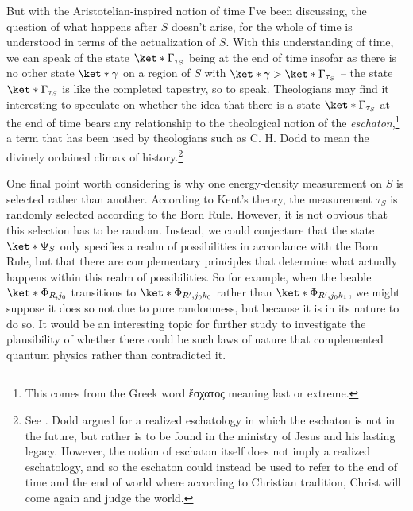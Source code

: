 \documentclass[12pt]{report}
\begin{document}
But with the Aristotelian-inspired notion of time I've been discussing, the question of what happens after $S$ doesn't arise, for the whole of time is understood in terms of the actualization of $S$. With this understanding of time, we can speak of the state $\ket*{\Gamma_{\tau_S}}$ being at the end of time insofar as there is no other state $\ket*{\gamma}$  on a region of $S$ with $\ket*{\gamma}>\ket*{\Gamma_{\tau_S}}$ -- the state $\ket*{\Gamma_{\tau_S}}$ is like the completed tapestry, so to speak. Theologians may find it interesting to speculate on whether the idea that there is a state $\ket*{\Gamma_{\tau_S}}$ at the end of time bears any relationship to the theological notion of the \emph{eschaton},\footnote{This comes from the Greek word \textgreek{ἔσχατος}   meaning last or extreme. } a term that has been used by theologians such as C. H. Dodd to mean the divinely ordained climax of history.\footnote{See \cite[36]{DoddC.H1961Tpot}. Dodd argued for a realized eschatology in which the eschaton is not in the future, but rather is to be found in the ministry of Jesus and his lasting legacy. However, the notion of eschaton itself does not imply a realized eschatology, and so the eschaton could instead be used to refer to the end of time and the end of world where according to Christian tradition, Christ will come again and judge the world.} 

One final point worth considering is why one energy-density measurement on $S$ is selected rather than another. According to Kent's theory, the measurement $\tau_S$ is randomly selected according to the Born Rule. However, it is not obvious that this selection has to be random. Instead, we could conjecture that the state $\ket*{\Psi_S}$ only specifies a realm of possibilities in accordance with the Born Rule, but that there are complementary principles that determine what actually happens within this realm of possibilities. So for example, when the beable $\ket*{\Phi_{R,j_0}}$ transitions to $\ket*{\Phi_{R', j_0k_0}}$ rather than $\ket*{\Phi_{R', j_0k_1}}$, we might suppose it does so not due to pure randomness, but because it is in its nature to do so. It would be an interesting topic for further study to investigate the plausibility of whether there could be such laws of nature that complemented quantum physics rather than contradicted it.




\end{document}
